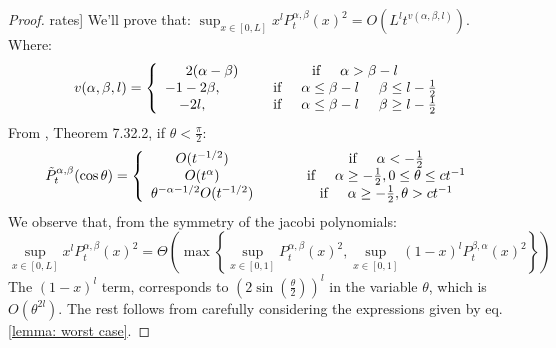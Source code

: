 \documentclass{article}
\begin{document}
\worstcase *
\begin{proof}
rates]
We'll prove that:  $\sup_{x\in[0,L]}x^lP_t^{\alpha,\beta}(x)^2=O(L^lt^{v(\alpha,\beta,l)})$. Where:
\begin{equation}
    v(\alpha,\beta,l)=\left\{
    \begin{array}{cc}
           2(\alpha-\beta) &\text{if} \hspace{0.5 cm} \alpha>\beta-l \\
         -1-2\beta, \hspace{1 cm} &\text{if} \hspace{0.5 cm} \alpha\leq \beta-l\hspace{0.5 cm} \beta\leq l-\frac{1}{2}\\
         -2l, \hspace{1 cm} &\text{if} \hspace{0.5 cm} \alpha\leq\beta-l\hspace{0.5 cm} \beta\geq l-\frac{1}{2} 
    \end{array}
    \right . 
\end{equation}
From \cite{szego1975orthogonal}, Theorem 7.32.2, if $\theta<\frac{\pi}{2}$:
\begin{equation}
    \Tilde{P}_t^{\alpha,\beta}(\cos \theta)=\left\{ 
    \begin{array}{cc}
         O(t^{-1/2})  \hspace{1 cm} &\text{if} \hspace{0.5 cm} \alpha < -\frac{1}{2} \\
         O(t^{\alpha})  \hspace{1 cm} &\text{if} \hspace{0.5 cm} \alpha \geq -\frac{1}{2} , 0\leq\theta\leq ct^{-1} \\
         \theta^{-
         \alpha-1/2}O(t^{-1/2})  \hspace{1 cm} &\text{if} \hspace{0.5 cm} \alpha \geq -\frac{1}{2} , \theta> ct^{-1}
    \end{array}
    \right .
\label{lemma: worst case}
\end{equation}
We observe that, from the symmetry of the jacobi polynomials:
\begin{equation}
    \sup_{x\in[0,L]}x^lP_t^{\alpha,\beta}(x)^2 =\Theta\left( \max\left\{\sup_{x\in[0,1]}P_t^{\alpha,\beta}(x)^2,\sup_{x\in[0,1]}(1-x)^lP_t^{\beta,\alpha}(x)^2\right\}\right)
\end{equation}
The $(1-x)^l$ term,  corresponds to $(2\sin(\frac{\theta}{2}))^l$ in the variable $\theta$, which is $O(\theta^{2l})$. The rest follows from carefully considering the expressions given by eq. \ref{lemma: worst case}.
\end{proof}
\end{document}
